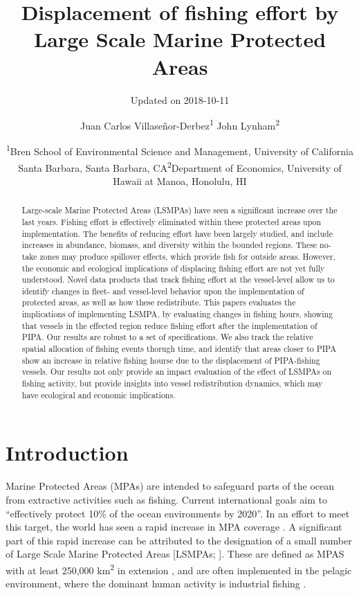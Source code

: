 \documentclass[12pt,]{article}
\title{Displacement of fishing effort by Large Scale Marine Protected Areas}
\subtitle{Updated on 2018-10-11}
\author{Juan Carlos Villaseñor-Derbez\textsuperscript{1} John
Lynham\textsuperscript{2}}
\date{\textsuperscript{1}Bren School of Environmental Science and Management,
University of California Santa Barbara, Santa Barbara,
CA\newline \textsuperscript{2}Department of Economics, University of
Hawaii at Manoa, Honolulu, HI}
\begin{document}
\maketitle
\begin{abstract}
Large-scale Marine Protected Areas (LSMPAs) have seen a significant
increase over the last years. Fishing effort is effectively eliminated
within these protected areas upon implementation. The benefits of
reducing effort have been largely studied, and include increases in
abundance, biomass, and diversity within the bounded regions. These
no-take zones may produce spillover effects, which provide fish for
outside areas. However, the economic and ecological implications of
displacing fishing effort are not yet fully understood. Novel data
products that track fishing effort at the vessel-level allow us to
identify changes in fleet- and vessel-level behavior upon the
implementation of protected areas, as well as how these redistribute.
This papers evaluates the implications of implementing LSMPA, by
evaluating changes in fishing hours, showing that vessels in the
effected region reduce fishing effort after the implementation of PIPA.
Our results are robust to a set of specifications. We also track the
relative spatial allocation of fishing events thorugh time, and identify
that areas closer to PIPA show an increase in relative fishing hourse
due to the displacement of PIPA-fishing vessels. Our results not only
provide an impact evaluation of the effect of LSMPAs on fishing
activity, but provide insights into vessel redistribution dynamics,
which may have ecological and economic implications.
\end{abstract}

\hypertarget{introduction}{%
\section{Introduction}\label{introduction}}

Marine Protected Areas (MPAs) are intended to safeguard parts of the
ocean from extractive activities such as fishing. Current international
goals aim to ``effectively protect 10\% of the ocean environments by
2020''. In an effort to meet this target, the world has seen a rapid
increase in MPA coverage \citep{wood_2008,sala_2018b}. A significant
part of this rapid increase can be attributed to the designation of a
small number of Large Scale Marine Protected Areas {[}LSMPAs;
\citep{gray_2017}{]}. These are defined as MPAS with at least 250,000
km\textsuperscript{2} in extension \citep{toonen_2013}, and are often
implemented in the pelagic environment, where the dominant human
activity is industrial fishing \citep{gray_2017}.
\end{document}
